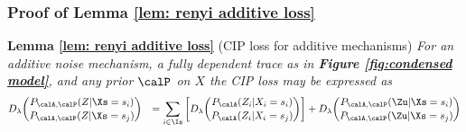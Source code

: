 \subsubsection{Proof of Lemma \ref{lem: renyi additive loss}}
\textbf{Lemma \ref{lem: renyi additive loss}} (CIP loss for additive mechanisms)
\textit{
	For an additive noise mechanism, a fully dependent trace as in \textbf{Figure \ref{fig:condensed model}}, and any prior $\calP$ on $X$ the CIP loss may be expressed as
	\begin{align}
		&D_\lambda \binom{P_{\calA, \calP}(Z | \Xs = s_i)}{P_{\calA, \calP}(Z | \Xs = s_j)}  
		&= \sum_{i \in \Is} \bigg[ D_\lambda \binom{P_\calA(Z_i | X_i = s_i)}{P_\calA(Z_i | X_i = s_j)} \bigg]
		+ D_\lambda \binom{P_{\calA, \calP}(\Zu | \Xs = s_i)}{P_{\calA, \calP}(\Zu | \Xs = s_j)} \notag
	\end{align}
}
